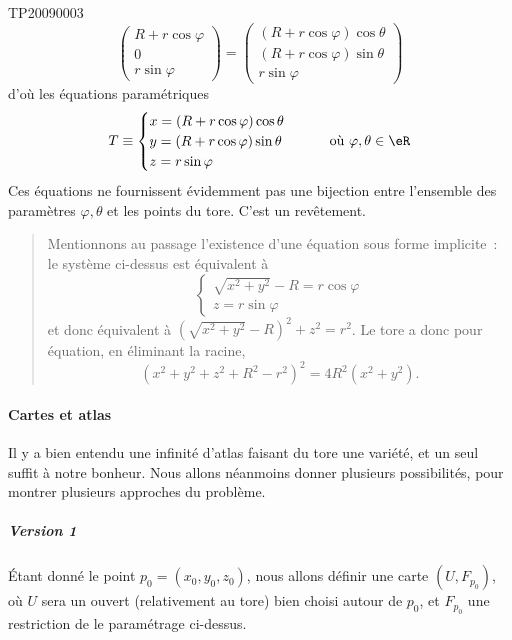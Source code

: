 \begin{corrige}{TP20090003}
\begin{equation*}
\begin{pmatrix}
    R + r\cos \varphi\\
    0\\
    r \sin \varphi
  \end{pmatrix}
  =
  \begin{pmatrix}
   (R + r\cos \varphi) \cos \theta\\
   (R + r\cos \varphi) \sin \theta\\
   r \sin \varphi
  \end{pmatrix}
\end{equation*}
d'où les équations paramétriques
\begin{equation}\label{torus_parameq}
  T \equiv
  \begin{cases}
    x = (R + r\cos \varphi) \cos \theta\\
    y = (R + r\cos \varphi) \sin \theta\\
    z = r \sin \varphi
  \end{cases} \qquad \text{où }\varphi,\theta \in \eR
\end{equation}
Ces équations ne fournissent évidemment pas une bijection entre
l'ensemble des paramètres $\varphi,\theta$ et les points du tore. C'est
un revêtement.

\begin{quote}
  Mentionnons au passage l'existence d'une équation sous forme
  implicite~: le système ci-dessus est équivalent à
  \begin{equation*}
    \begin{cases}
      \sqrt{x^2+y^2} - R = r \cos \varphi\\
      z = r \sin \varphi
    \end{cases}
  \end{equation*}
  et donc équivalent à $(\sqrt{x^2+y^2} - R)^2 + z^2 = r^2$. Le tore a
  donc pour équation, en éliminant la racine,
  \begin{equation*}
    (x^2 + y^2 + z^2 + R^2 - r^2)^2 = 4 R^2 (x^2+y^2).
  \end{equation*}
\end{quote}

\paragraph{Cartes et atlas}
Il y a bien entendu une infinité d'atlas faisant du tore une variété,
et un seul suffit à notre bonheur. Nous allons néanmoins donner
plusieurs possibilités, pour montrer plusieurs approches du
problème.

\subparagraph{Version 1} Étant donné le point $p_0 = (x_0,y_0,z_0)$,
nous allons définir une carte $(U,F_{p_0})$, où $U$ sera un ouvert
(relativement au tore) bien choisi autour de $p_0$, et $F_{p_0}$ une
restriction de le paramétrage ci-dessus.


\end{corrige}
